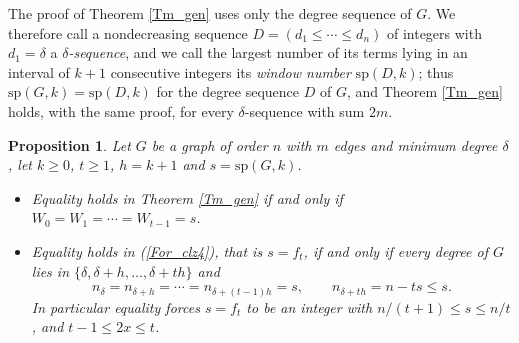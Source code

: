 \documentclass[10pt,a4paper]{article}
\newtheorem{proposition}[theorem]{Proposition}
\begin{document}


The proof of Theorem \ref{Tm_gen} uses only the degree sequence of $G$. We therefore call a
nondecreasing sequence $D=(d_{1}\leq \cdots \leq d_{n})$ of integers with $d_{1}=\delta $ a
\emph{$\delta $-sequence}, and we call the largest number of its terms lying in an interval of $k+1$
consecutive integers its \emph{window number} $\mathrm{sp}(D,k)$; thus $\mathrm{sp}(G,k)=\mathrm{sp}%
(D,k)$ for the degree sequence $D$ of $G$, and Theorem \ref{Tm_gen} holds, with the same proof, for
every $\delta $-sequence with sum $2m$.

\begin{proposition}
\label{Prop_equality}Let $G$ be a graph of order $n$ with $m$ edges and minimum degree $\delta $, let
$k\geq 0$, $t\geq 1$, $h=k+1$ and $s=\mathrm{sp}(G,k)$.

\begin{itemize}
\item[\textrm{(i)}] Equality holds in Theorem \ref{Tm_gen} if and only if $W_{0}=W_{1}=\cdots
=W_{t-1}=s$.

\item[\textrm{(ii)}] Equality holds in (\ref{For_clz4}), that is $s=f_{t}$, if and only if every
degree of $G$ lies in $\{\delta ,\delta +h,\ldots ,\delta +th\}$ and
\[
n_{\delta }=n_{\delta +h}=\cdots =n_{\delta +(t-1)h}=s,\qquad n_{\delta +th}=n-ts\leq s.
\]
In particular equality forces $s=f_{t}$ to be an integer with $n/(t+1)\leq s\leq n/t$, and
$t-1\leq 2x\leq t$.
\end{itemize}
\end{proposition}
\end{document}
